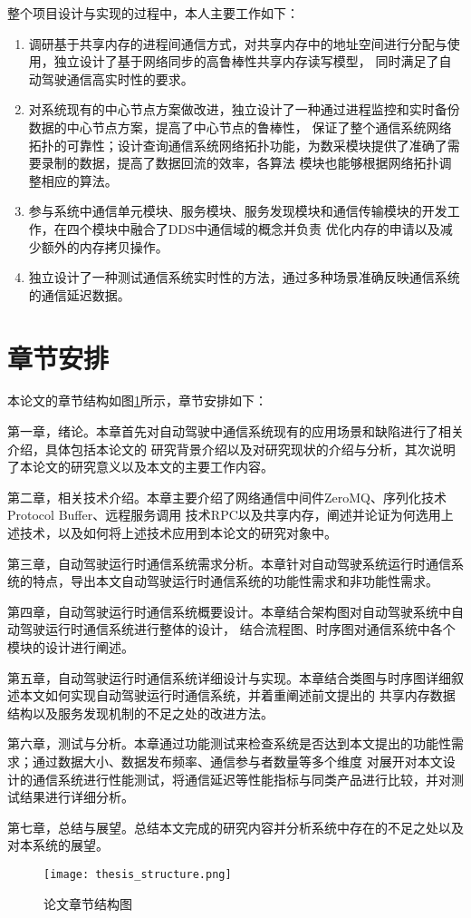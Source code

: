 整个项目设计与实现的过程中，本人主要工作如下：
\begin{enumerate}
  \item 调研基于共享内存的进程间通信方式，对共享内存中的地址空间进行分配与使用，独立设计了基于网络同步的高鲁棒性共享内存读写模型，
  同时满足了自动驾驶通信高实时性的要求。
  \item 对系统现有的中心节点方案做改进，独立设计了一种通过进程监控和实时备份数据的中心节点方案，提高了中心节点的鲁棒性，
  保证了整个通信系统网络拓扑的可靠性；设计查询通信系统网络拓扑功能，为数采模块提供了准确了需要录制的数据，提高了数据回流的效率，各算法
  模块也能够根据网络拓扑调整相应的算法。
  \item 参与系统中通信单元模块、服务模块、服务发现模块和通信传输模块的开发工作，在四个模块中融合了DDS中通信域的概念并负责
  优化内存的申请以及减少额外的内存拷贝操作。
  \item 独立设计了一种测试通信系统实时性的方法，通过多种场景准确反映通信系统的通信延迟数据。
\end{enumerate}

\section{章节安排}
本论文的章节结构如图\ref{thesis_structure}所示，章节安排如下：

第一章，绪论。本章首先对自动驾驶中通信系统现有的应用场景和缺陷进行了相关介绍，具体包括本论文的
研究背景介绍以及对研究现状的介绍与分析，其次说明了本论文的研究意义以及本文的主要工作内容。

第二章，相关技术介绍。本章主要介绍了网络通信中间件ZeroMQ、序列化技术Protocol Buffer、远程服务调用
技术RPC以及共享内存，阐述并论证为何选用上述技术，以及如何将上述技术应用到本论文的研究对象中。

第三章，自动驾驶运行时通信系统需求分析。本章针对自动驾驶系统运行时通信系统的特点，导出本文自动驾驶运行时通信系统的功能性需求和非功能性需求。

第四章，自动驾驶运行时通信系统概要设计。本章结合架构图对自动驾驶系统中自动驾驶运行时通信系统进行整体的设计，
结合流程图、时序图对通信系统中各个模块的设计进行阐述。

第五章，自动驾驶运行时通信系统详细设计与实现。本章结合类图与时序图详细叙述本文如何实现自动驾驶运行时通信系统，并着重阐述前文提出的
共享内存数据结构以及服务发现机制的不足之处的改进方法。

第六章，测试与分析。本章通过功能测试来检查系统是否达到本文提出的功能性需求；通过数据大小、数据发布频率、通信参与者数量等多个维度
对展开对本文设计的通信系统进行性能测试，将通信延迟等性能指标与同类产品进行比较，并对测试结果进行详细分析。

第七章，总结与展望。总结本文完成的研究内容并分析系统中存在的不足之处以及对本系统的展望。

\begin{figure}[H]
  \centering
  \texttt{[image: thesis\_structure.png]}
  \caption{论文章节结构图}
  \label{thesis_structure}
\end{figure}






